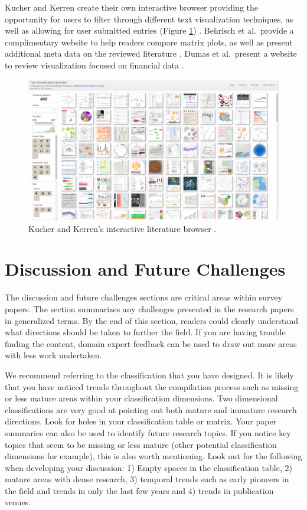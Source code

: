 Kucher and Kerren create their own interactive browser providing the opportunity for users to filter through different text visualization techniques, as well as allowing for user submitted entries (Figure \ref{fig:browser}) \cite{kucher2015text}. Behrisch et al.\ provide a complimentary website to help readers compare matrix plots, as well as present additional meta data on the reviewed literature \cite{matrixreorderingVis}. Dumas et al.\ present a website to review visualization focused on financial data \cite{dumas2014financevis}.


\begin{figure}[t]
\centering
\includegraphics[width=1\linewidth]{pictures/kucherkerren.png}
\caption{Kucher and Kerren's interactive literature browser . 
 \cite{kucher2015text}} \label{fig:browser}
\end{figure}

\section{Discussion and Future Challenges} \label{sec:fut}
The discussion and future challenges sections are critical areas within survey papers. The section summarizes any challenges presented in the research papers in generalized terms. By the end of this section, readers could clearly understand what directions should be taken to further the field. If you are having trouble finding the content, domain expert feedback can be used to draw out more areas with less work undertaken.

We recommend referring to the classification that you have designed. It is likely that you have noticed trends throughout the compilation process such as missing or less mature areas within your classification dimensions. Two dimensional classifications are very good at pointing out both mature and immature research directions. Look for holes in your classification table or matrix. Your paper summaries can also be used to identify future research topics. If you notice key topics that seem to be missing or less mature (other potential classification dimensions for example), this is also worth mentioning. Look out for the following when developing your discussion: 1) Empty spaces in the classification table, 2) mature areas with dense research, 3) temporal trends such as early pioneers in the field and trends in only the last few years and 4) trends in publication venues.


